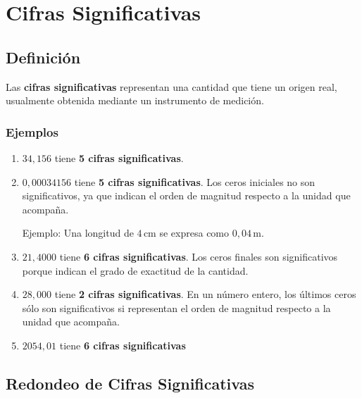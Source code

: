 \chapter{Cifras Significativas}

\section{Definición}

Las \textbf{cifras significativas} representan una cantidad que tiene un origen real, usualmente obtenida mediante un instrumento de medición.

\subsection{Ejemplos}
\begin{enumerate}
    \item $34,156$ tiene \textbf{5 cifras significativas}.
    \item $0,00034156$ tiene \textbf{5 cifras significativas}. Los ceros iniciales no son significativos, ya que indican el orden de magnitud respecto a la unidad que acompaña.
    
    Ejemplo: Una longitud de $4 \, \text{cm}$ se expresa como $0,04 \, \text{m}$.
    
    \item $21,4000$ tiene \textbf{6 cifras significativas}. Los ceros finales son significativos porque indican el grado de exactitud de la cantidad.
    \item $28,000$ tiene \textbf{2 cifras significativas}. En un número entero, los últimos ceros sólo son significativos si representan el orden de magnitud respecto a la unidad que acompaña.
    \item $2054,01$ tiene \textbf{6 cifras significativas}
    
    \end{enumerate}

\newpage
\section{Redondeo de Cifras Significativas}

